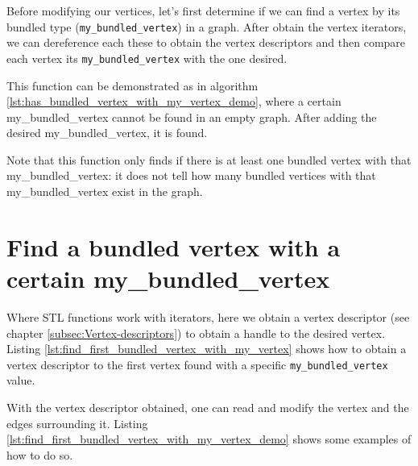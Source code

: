 Before modifying our vertices, let's first determine if we can find a vertex
by its bundled type (\verb;my_bundled_vertex;) in a graph.
After obtain the vertex iterators, we can dereference each these to obtain
the vertex descriptors and then compare each vertex its \verb;my_bundled_vertex;
with the one desired.



This function can be demonstrated as in algorithm 
\ref{lst:has_bundled_vertex_with_my_vertex_demo}, 
where a certain my\_bundled\_vertex cannot be found in an empty graph.
After adding the desired my\_bundled\_vertex, it is found.



Note that this function only finds if there is at least one bundled vertex
with that my\_bundled\_vertex: it does not tell how many bundled vertices
with that my\_bundled\_vertex exist in the graph.

\section{Find a bundled vertex with a certain my\_bundled\_vertex}
\label{subsec:find_bundled_vertex_with_my_vertex}

Where STL functions work with iterators, here we obtain a vertex descriptor
(see chapter \ref{subsec:Vertex-descriptors}) 
to obtain a handle to the desired vertex.
Listing \ref{lst:find_first_bundled_vertex_with_my_vertex}
shows how to obtain a vertex descriptor to the first vertex found with
a specific \verb;my_bundled_vertex; value.



With the vertex descriptor obtained, one can read and modify the vertex
and the edges surrounding it.
Listing 
\ref{lst:find_first_bundled_vertex_with_my_vertex_demo}
shows some examples of how to do so.

